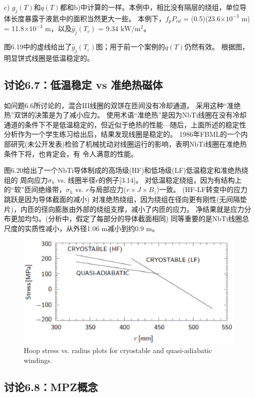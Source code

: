 c) $g_j(T)$和$q(T)$都和b)中计算的一样。本例中，相比没有隔层的绕组，单位导体长度暴露于液氦中的面积当然更大一些。
本例下，$f_p P_{cd}$ = (0.5)(23.6$\times 10^{-3}$ m) = 11.8$\times 10^{-3}$ m，以及$\hat{g}_j(T_c)$
= 9.34 $\mathrm{kW/m^2}$。

图6.19中的虚线给出了$\hat{g}_j(T_c)$图；用于前一个案例的$q(T)$仍然有效。
根据图，明显饼式线圈是低温稳定的。

\subsection{讨论6.7：低温稳定 vs 准绝热磁体}
如问题6.6所讨论的，混合III线圈的双饼在匝间没有冷却通道。
采用这种“准绝热”双饼的决策是为了减小应力。
使用术语“准绝热”是因为NbTi线圈在没有冷却通道的条件下不是低温稳定的，但近似于绝热的性能---随后，上面所述的稳定性
分析作为一个学生练习给出后，结果发现线圈是稳定的。
1986年FBML的一个内部研究(未公开发表)检验了机械扰动对线圈运行的影响，表明NbTi线圈在准绝热条件下将，也肯定会，有
令人满意的性能。

图6.20给出了一个NbTi导体制成的高场级(HF)和低场级(LF)低温稳定和准绝热绕组的
周向应力$\sigma_h$ vs. 线圈半径$r$的例子[3.14]。
对低温稳定绕组，因为有结构上的“软”匝间绝缘带，$\sigma_h$ vs. $r$与局部应力($r\times J\times B_z$)一致。
(HF-LF转变中的应力跳跃是因为导体截面的减小)
对准绝热绕组，因为绕组在径向更有刚性(无间隔垫片)，内匝的径向膨胀由外部的绕组支撑，减小了内匝的应力。
净结果就是应力分布更加均匀。(分析中，假定了每部分的导体截面相同)
同等重要的是NbTi线圈总尺度的实质性减小，从外径1.06 m减小到约0.9 m。

\begin{figure}[htbp]
	\centering
	\includegraphics[scale=0.7]{chpt6/figs/fig6.20.eps}
	\caption{Hoop stress vs. radius plots for cryostable and quasi-adiabatic windings.}
\end{figure}


\subsection{讨论6.8：MPZ概念}



